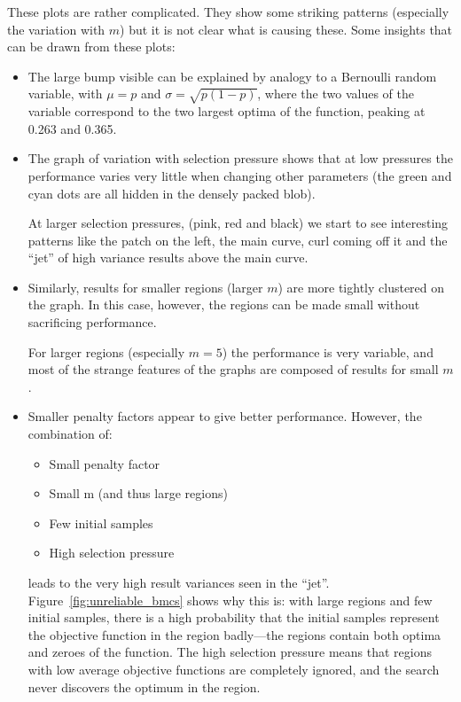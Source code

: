 \documentclass[10pt]{article}
\begin{document}
These plots are rather complicated. They show some striking patterns
(especially the variation with $m$) but it is not clear what is causing these.
Some insights that can be drawn from these plots:

\begin{itemize}
  \item 
    The large bump visible can be explained by analogy to a Bernoulli random
    variable, with $\mu = p$ and $\sigma = \sqrt{p(1-p)}$, where the two values of
    the variable correspond to the two largest optima of the function, peaking at
    0.263 and 0.365.

  \item
    The graph of variation with selection pressure shows that at low pressures
    the performance varies very little when changing other parameters (the
    green and cyan dots are all hidden in the densely packed blob).
    
    At larger selection pressures, (pink, red and black) we start to see
    interesting patterns like the patch on the left, the main curve, curl
    coming off it and the ``jet'' of high variance results above the main
    curve.

  \item
    Similarly, results for smaller regions (larger $m$) are more tightly
    clustered on the graph. In this case, however, the regions can be made
    small without sacrificing performance.

    For larger regions (especially $m = 5$) the performance is very variable,
    and most of the strange features of the graphs are composed of results for
    small $m$.

  \item
    Smaller penalty factors appear to give better performance. However,
    the combination of:
    \begin{itemize}
      \item Small penalty factor
      \item Small m (and thus large regions)
      \item Few initial samples
      \item High selection pressure
    \end{itemize}
    leads to the very high result variances seen in the ``jet''.
    Figure~\ref{fig:unreliable_bmcs} shows why this is: with large regions and
    few initial samples, there is a high probability that the initial samples
    represent the objective function in the region badly---the regions
    contain both optima and zeroes of the function. The high selection
    pressure means that regions with low average objective functions are
    completely ignored, and the search never discovers the optimum in the
    region.


\end{itemize}
\end{document}
